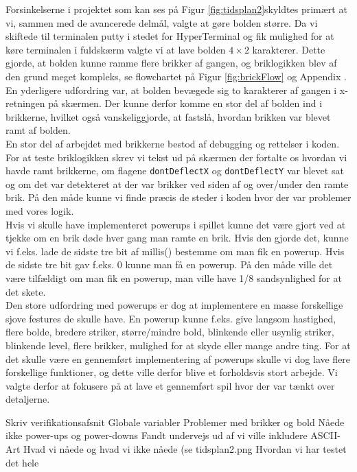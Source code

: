 Forsinkelserne i projektet som kan ses på Figur \ref{fig:tidsplan2}skyldtes primært at vi, sammen med de avancerede delmål, valgte at gøre bolden større. Da vi skiftede til terminalen putty i stedet for HyperTerminal og fik mulighed for at køre terminalen i fuldskærm valgte vi at lave bolden $4\times2$ karakterer. Dette gjorde, at bolden kunne ramme flere brikker af gangen, og briklogikken blev af den grund meget kompleks, se flowchartet på Figur \ref{fig:brickFlow} og  Appendix . En yderligere udfordring var, at bolden bevægede sig to karakterer af gangen i x-retningen på skærmen. Der kunne derfor komme en stor del af bolden ind i brikkerne, hvilket også vanskeliggjorde, at fastslå, hvordan brikken var blevet ramt af bolden. \\ 
En stor del af arbejdet med brikkerne bestod af debugging og rettelser i koden. For at teste briklogikken skrev vi tekst ud på skærmen der fortalte os hvordan vi havde ramt brikkerne, om flagene \texttt{dontDeflectX} og \texttt{dontDeflectY} var blevet sat og om det var detekteret at der var brikker ved siden af og over/under den ramte brik. På den måde kunne vi finde præcis de steder i koden hvor der var problemer med vores logik.\\

Hvis vi skulle have implementeret powerups i spillet kunne det være gjort ved at tjekke om en brik døde hver gang man ramte en brik. Hvis den gjorde det, kunne vi f.eks. lade de sidste tre bit af millis() bestemme om man fik en powerup. Hvis de sidste tre bit gav f.eks. 0 kunne man få en powerup. På den måde ville det være tilfældigt om man fik en powerup, man ville have 1/8 sandsynlighed for at det skete. \\
Den store udfordring med powerups er dog at implementere en masse forskellige sjove festures de skulle have. En powerup kunne f.eks. give langsom hastighed, flere bolde, bredere striker, større/mindre bold, blinkende eller usynlig striker, blinkende level, flere brikker, mulighed for  at skyde eller mange andre ting. For at det skulle være en gennemført implementering af powerups skulle vi dog lave flere forskellige funktioner, og dette ville derfor blive et forholdsvis stort arbejde. Vi valgte derfor at fokusere på at lave et gennemført spil hvor der var tænkt over detaljerne. 



Skriv verifikationsafsnit
	Globale variabler
	Problemer med brikker og bold
	Nåede ikke power-ups og power-downs
	Fandt undervejs ud af vi ville inkludere ASCII-Art
	Hvad vi nåede og hvad vi ikke nåede (se tidsplan2.png
	Hvordan vi har testet det hele


